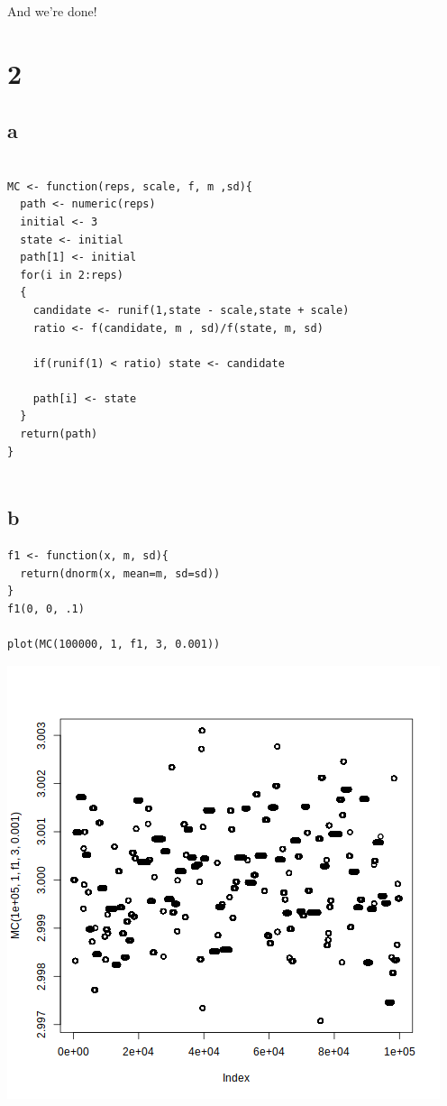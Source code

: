\documentclass[11pt]{article}
\begin{document}
And we're done!

\section*{2}
\label{sec:org24bd4a4}
\subsection*{a}
\label{sec:org8c0d4e7}
\begin{verbatim}

MC <- function(reps, scale, f, m ,sd){
  path <- numeric(reps)
  initial <- 3
  state <- initial
  path[1] <- initial
  for(i in 2:reps)
  {
    candidate <- runif(1,state - scale,state + scale)
    ratio <- f(candidate, m , sd)/f(state, m, sd)

    if(runif(1) < ratio) state <- candidate

    path[i] <- state
  }
  return(path)
}


\end{verbatim}

\subsection*{b}
\label{sec:org796274a}

\begin{verbatim}
f1 <- function(x, m, sd){
  return(dnorm(x, mean=m, sd=sd))
}
f1(0, 0, .1)

plot(MC(100000, 1, f1, 3, 0.001))
\end{verbatim}

\begin{center}
\includegraphics[width=.9\linewidth]{fig0.png}
\end{center}
\end{document}
